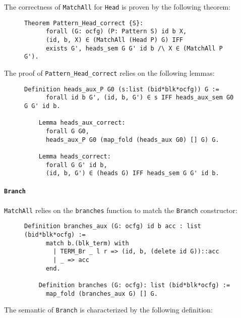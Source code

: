 \documentclass[11pt]{article}
\newcommand{\inlinecoq}[1]{\mbox{\lstinline[style=customcoq,columns=fixed,basewidth=.48em]{#1}}}
\newcommand{\ilc}[1]{\inlinecoq{#1}}
\begin{document}
The correctness of \ilc{MatchAll} for \ilc{Head} is proven by the following theorem:

\begin{figure}[H]
  \label{fig:sem_block}
  \begin{lstlisting}[style=customcoq,basicstyle=\small\ttfamily]
    Theorem Pattern_Head_correct {S}:
      forall (G: ocfg) (P: Pattern S) id b X,
      (id, b, X) ∈ (MatchAll (Head P) G) IFF
      exists G', heads_sem G G' id b /\ X ∈ (MatchAll P G').
  \end{lstlisting}
\end{figure}

The proof of \ilc{Pattern_Head_correct} relies on the following lemmas:

\begin{figure}[H]
  \label{fig:block_cor}
  \begin{lstlisting}[style=customcoq,basicstyle=\small\ttfamily]
    Definition heads_aux_P G0 (s:list (bid*blk*ocfg)) G :=
      forall id b G', (id, b, G') ∈ s IFF heads_aux_sem G0 G G' id b.

    Lemma heads_aux_correct:
      forall G G0,
      heads_aux_P G0 (map_fold (heads_aux G0) [] G) G.

    Lemma heads_correct:
      forall G G' id b,
      (id, b, G') ∈ (heads G) IFF heads_sem G G' id b.
  \end{lstlisting}
\end{figure}

\paragraph{\ilc{Branch}}

\ilc{MatchAll} relies on the \ilc{branches} function to match the \ilc{Branch} constructor:

\begin{figure}[H]
  \label{fig:branches_fun}
  \begin{lstlisting}[style=customcoq,basicstyle=\small\ttfamily]
    Definition branches_aux (G: ocfg) id b acc : list (bid*blk*ocfg) :=
      match b.(blk_term) with
        | TERM_Br _ l r => (id, b, (delete id G))::acc
        | _ => acc
      end.

    Definition branches (G: ocfg): list (bid*blk*ocfg) :=
      map_fold (branches_aux G) [] G.
  \end{lstlisting}
\end{figure}

The semantic of \ilc{Branch} is characterized by the following definition:
\end{document}
